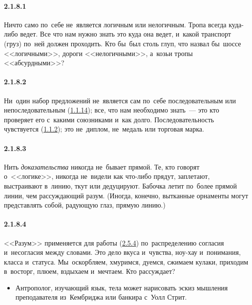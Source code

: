 \paragraph{2.1.8.1}\hypertarget{par:2.1.8.1}{} Ничто само по~себе не~является логичным или нелогичным. Тропа всегда куда-либо ведет. Все что нам нужно знать это куда она ведет, и~какой транспорт (груз) по~ней должен проходить. Кто бы~был столь глуп, что назвал бы~шоссе <<логичными>>, дороги <<нелогичными>>, а~козьи тропы <<абсурдными>>?

\paragraph{2.1.8.2}\hypertarget{par:2.1.8.2}{} Ни~один набор предложений не~является сам по~себе последовательным или непоследовательным (\hyperlink{par:1.1.14}{1.1.14}); все, что нам необходимо знать~--- это кто проверяет его с~какими союзниками и~как долго. Последовательность чувствуется (\hyperlink{par:1.1.2}{1.1.2}); это не~диплом, не~медаль или торговая марка.

\paragraph{2.1.8.3}\hypertarget{par:2.1.8.3}{} Нить {\itshape доказательства} никогда не~бывает прямой. Те, кто говорят о~<<логике>>, никогда не~видели как что-либо прядут, заплетают, выстраивают в~линию, ткут или дедуцируют. Бабочка летит по~более прямой линии, чем рассуждающий разум. (Иногда, конечно, вытканные орнаменты могут представлять собой, радующую глаз, прямую
линию.)

\paragraph{2.1.8.4}\hypertarget{par:2.1.8.4}{} <<Разум>> применяется для работы (\hyperlink{par:2.5.4}{2.5.4}) по~распределению согласия и~несогласия между словами. Это дело вкуса и~чувства, ноу-хау и~понимания, класса и~статуса. Мы~оскорбляем, хмуримся, дуемся, сжимаем кулаки, приходим в~восторг, плюем, вздыхаем и~мечтаем. Кто рассуждает?
	\begin{itemize}
	\item 
	Антрополог, изучающий язык, тела может нарисовать эскиз мышления преподавателя из~Кембриджа или банкира с~Уолл Стрит.
	\end{itemize}

